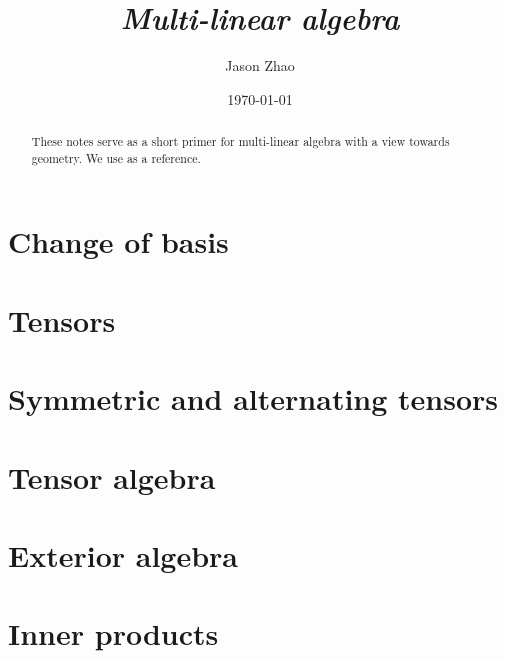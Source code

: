 \documentclass[reqno]{amsart}
\title
{
	\emph{Multi-linear algebra}
}
\author{Jason Zhao}
\date{\today}
\begin{document}
\maketitle

\begin{abstract}
	These notes serve as a short primer for multi-linear algebra with a view towards geometry. We use \cite[Chapter 12]{Lee2012} as a reference. 
\end{abstract}	

\tableofcontents

\section{Change of basis}


\section{Tensors}


\section{Symmetric and alternating tensors}


\section{Tensor algebra}


\section{Exterior algebra}


\section{Inner products}




\end{document}
